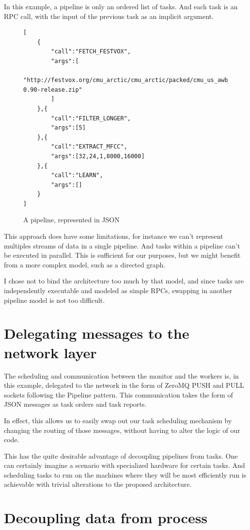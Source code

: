 \documentclass[12pt, a4paper]{article}
\begin{document}
In this example, a pipeline is only an ordered list of tasks.
And each task is an RPC call, with the input of the previous task as an implicit argument.
\begin{figure}[htpb]
    \centering
    \begin{lstlisting}
[
    {
        "call":"FETCH_FESTVOX",
        "args":[
          "http://festvox.org/cmu_arctic/cmu_arctic/packed/cmu_us_awb_arctic-0.90-release.zip"
        ]
    },{
        "call":"FILTER_LONGER",
        "args":[5]
    },{
        "call":"EXTRACT_MFCC",
        "args":[32,24,1,8000,16000]
    },{
        "call":"LEARN",
        "args":[]
    }
]
    \end{lstlisting}
    \caption{A pipeline, represented in JSON}
\end{figure}

This approach does have some limitations, for instance we can't represent multiples streams of data
in a single pipeline. And tasks within a pipeline can't be executed in parallel.
This is sufficient for our purposes, but we might benefit from a more complex model, such as a directed graph.

I chose not to bind the architecture too much by that model,
and since tasks are independently executable and modeled as simple RPCs, swapping in another pipeline model is not too difficult.

\section{Delegating messages to the network layer}

The scheduling and communication between the monitor and the workers is, in this example, delegated
to the network in the form of ZeroMQ PUSH and PULL sockets following the Pipeline pattern.
This communication takes the form of JSON messages as task orders and task reports.

In effect, this allows us to easily swap out our task scheduling mechanism by changing the routing
of those messages, without having to alter the logic of our code.

This has the quite desirable advantage of decoupling pipelines from tasks.
One can certainly imagine a scenario with specialized hardware for certain tasks. And scheduling tasks to run on
the machines where they will be most efficiently run is achievable with trivial alterations to the proposed architecture.

\section{Decoupling data from process}
\end{document}
